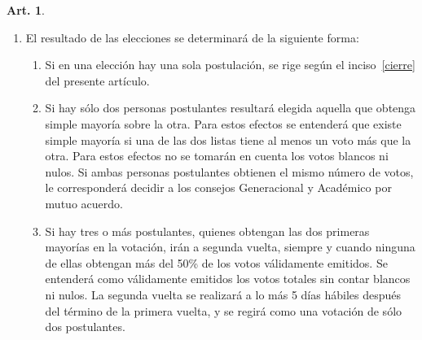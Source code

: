 \documentclass[letterpaper,11pt]{article}
\theoremstyle{definition}%
\newtheorem{art}{Art.} %
\begin{document}
\begin{art}
\begin{enumerate}
		\item El resultado de las elecciones se determinará de la siguiente forma:
		      \begin{enumerate}
			      \item Si en una elección hay una sola postulación, se rige según el inciso~\ref{cierre} del presente artículo.
			      \item Si hay sólo dos personas postulantes resultará elegida aquella que obtenga simple mayoría sobre la otra. Para estos efectos se entenderá que existe simple mayoría si una de las dos listas tiene al menos un voto más que la otra. Para estos efectos no se tomarán en cuenta los votos blancos ni nulos. Si ambas personas postulantes obtienen el mismo número de votos, le corresponderá decidir a los consejos Generacional y Académico por mutuo acuerdo.
			      \item Si hay tres o más postulantes, quienes obtengan las dos primeras mayorías en la votación, irán a segunda vuelta, siempre y cuando ninguna de ellas obtengan más del 50\% de los votos válidamente emitidos. Se entenderá como válidamente emitidos los votos totales sin contar blancos ni nulos. La segunda vuelta se realizará a lo más 5 días hábiles después del término de la primera vuelta, y se regirá como una votación de sólo dos postulantes.
		      \end{enumerate}
	\end{enumerate}
\end{art}
\end{document}
